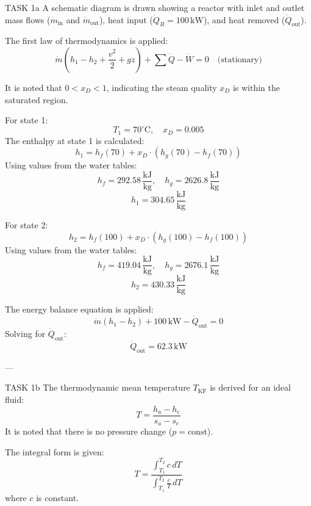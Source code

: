TASK 1a  
A schematic diagram is drawn showing a reactor with inlet and outlet mass flows (\( \dot{m}_{\text{in}} \) and \( \dot{m}_{\text{out}} \)), heat input (\( \dot{Q}_R = 100 \, \text{kW} \)), and heat removed (\( \dot{Q}_{\text{out}} \)).  

The first law of thermodynamics is applied:  
\[
\dot{m} (h_1 - h_2 + \frac{v^2}{2} + gz) + \sum \dot{Q} - \dot{W} = 0 \quad \text{(stationary)}
\]  

It is noted that \( 0 < x_D < 1 \), indicating the steam quality \( x_D \) is within the saturated region.  

For state 1:  
\[
T_1 = 70^\circ\text{C}, \quad x_D = 0.005
\]  
The enthalpy at state 1 is calculated:  
\[
h_1 = h_f(70) + x_D \cdot (h_g(70) - h_f(70))
\]  
Using values from the water tables:  
\[
h_f = 292.58 \, \frac{\text{kJ}}{\text{kg}}, \quad h_g = 2626.8 \, \frac{\text{kJ}}{\text{kg}}
\]  
\[
h_1 = 304.65 \, \frac{\text{kJ}}{\text{kg}}
\]  

For state 2:  
\[
h_2 = h_f(100) + x_D \cdot (h_g(100) - h_f(100))
\]  
Using values from the water tables:  
\[
h_f = 419.04 \, \frac{\text{kJ}}{\text{kg}}, \quad h_g = 2676.1 \, \frac{\text{kJ}}{\text{kg}}
\]  
\[
h_2 = 430.33 \, \frac{\text{kJ}}{\text{kg}}
\]  

The energy balance equation is applied:  
\[
\dot{m} (h_1 - h_2) + 100 \, \text{kW} - \dot{Q}_{\text{out}} = 0
\]  
Solving for \( \dot{Q}_{\text{out}} \):  
\[
\dot{Q}_{\text{out}} = 62.3 \, \text{kW}
\]  

---

TASK 1b  
The thermodynamic mean temperature \( T_{\text{KF}} \) is derived for an ideal fluid:  
\[
T = \frac{h_a - h_e}{s_a - s_e}
\]  
It is noted that there is no pressure change (\( p = \text{const} \)).  

The integral form is given:  
\[
T = \frac{\int_{T_1}^{T_2} c \, dT}{\int_{T_1}^{T_2} \frac{c}{T} \, dT}
\]  
where \( c \) is constant.